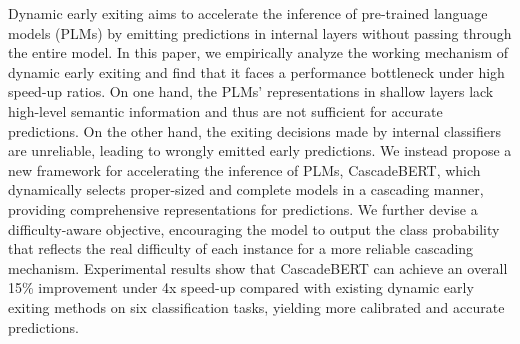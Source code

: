 Dynamic early exiting aims to accelerate the inference of pre-trained language models (PLMs) by emitting predictions in internal layers without passing through the entire model. In this paper, we empirically analyze the working mechanism of dynamic early exiting and find that it faces a performance bottleneck under high speed-up ratios. On one hand, the PLMs' representations in shallow layers lack high-level semantic information and thus are not sufficient for accurate predictions. On the other hand, the exiting decisions made by internal classifiers are unreliable, leading to wrongly emitted early predictions. We instead propose a new framework for accelerating the inference of PLMs, CascadeBERT, which dynamically selects proper-sized and complete models in a cascading manner, providing comprehensive representations for predictions. We further devise a difficulty-aware objective, encouraging the model to output the class probability that reflects the real difficulty of each instance for a more reliable cascading mechanism. Experimental results show that CascadeBERT can achieve an overall 15\% improvement under 4x speed-up compared with existing dynamic early exiting methods on six classification tasks, yielding more calibrated and accurate predictions.
